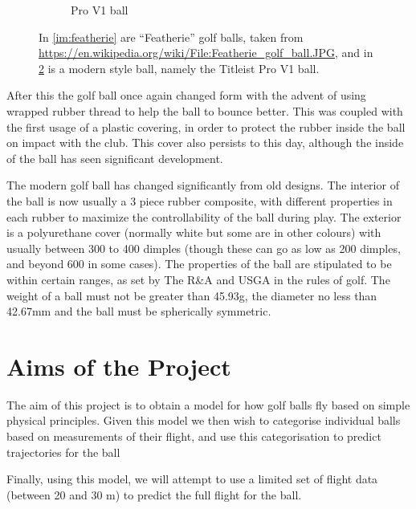 \begin{figure}[h]
\begin{subfigure}[b]{0.4\textwidth}
\caption{Pro V1 ball}
\label{im:pv1}
\end{subfigure}
\caption[Images of golf balls]{In \ref{im:featherie} are ``Featherie'' golf balls, taken from 
\url{https://en.wikipedia.org/wiki/File:Featherie_golf_ball.JPG}, 
and in \ref{im:pv1} is a modern style ball, namely the Titleist Pro V1 ball.}
\end{figure}

After this the golf ball once again changed form with the advent of using wrapped rubber
thread to help the ball to bounce better. This was coupled with the first usage of a plastic 
covering, in order to protect the rubber inside the ball on impact with the
club. This cover also persists to this day, although the inside of the ball has seen significant
development.

The modern golf ball has changed significantly from old designs. The interior of the ball is
now usually a 3 piece rubber composite, with different properties in each rubber to maximize
the controllability of the ball during play. The exterior is a polyurethane cover (normally white
but some are in other colours) with usually between 300 to 400 dimples (though these can go as 
low as 200 dimples, and beyond 600 in some cases). The properties of the ball are stipulated to be
within certain ranges, as set by The R\&A and USGA in the rules of golf. The weight of a ball must
not be greater than 45.93g, the diameter no less than 42.67mm and the ball must be spherically symmetric.

\section{Aims of the Project}

The aim of this project is to obtain a model for how golf balls fly based on simple physical principles.
Given this model we then wish to categorise individual balls based on measurements of their flight, and
use this categorisation to predict trajectories for the ball 

Finally, using this model, we will attempt to use a limited set of flight data (between 20 and 30 m)
to predict the full flight for the ball.